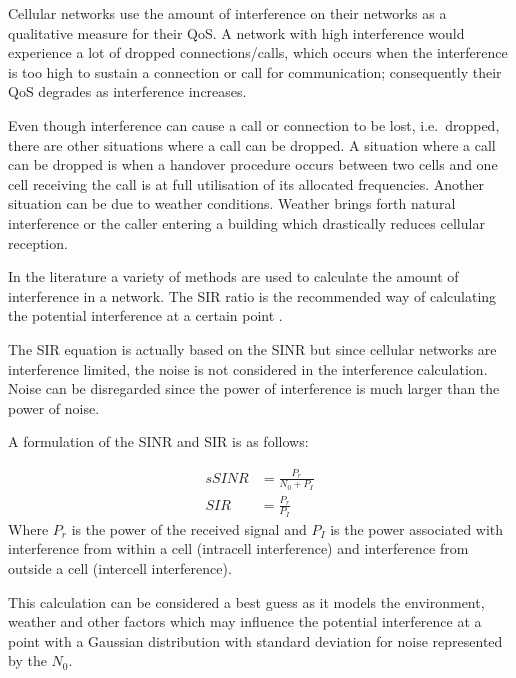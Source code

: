 Cellular networks use the amount of interference on their networks as a qualitative measure for their \gls{QoS}\cite{WirelessCommunications}. A network with high interference would experience a lot of dropped connections/calls, which occurs when the interference is too high to sustain a connection or call for communication; consequently their \gls{QoS} degrades as interference increases\cite{WirelessCommunications,WirelessDigitalCommunications}.

Even though interference can cause a call or connection to be lost, i.e.\ dropped, there are other situations where a call can be dropped\cite{GSMSysEngin}. A situation where a call can be dropped is when a handover procedure occurs between two cells and one cell receiving the call is at full utilisation of its allocated frequencies\cite{GSMSysEngin,WirelessDigitalCommunications}. Another situation can be due to weather conditions. Weather brings forth natural interference or the caller entering a building which drastically reduces cellular reception\cite{WirelessDigitalCommunications}.

In the literature a variety of methods are used to calculate the amount of interference in a network. The \gls{SIR} ratio is the recommended way of calculating the potential interference at a certain point \cite{Karen2004}. 

The \gls{SIR} equation is actually based on the \gls{SINR} but since cellular networks are interference limited, the noise is not considered in the interference calculation\cite{WirelessCommunications}. Noise can be disregarded since the power of interference is much larger than the power of noise\cite{WirelessDigitalCommunications}.

A formulation of the \gls{SINR} and \gls{SIR} is as follows:

\begin{align}s 
	SINR &= \frac{P_r}{N_0 + P_I}\\
	SIR &= \frac{P_r}{P_I}
\end{align}
Where $P_r$ is the power of the received signal and $P_I$ is the power associated with interference from within a cell (intracell interference) and interference from outside a cell (intercell interference)\cite{WirelessCommunications}.

This calculation can be considered a best guess as it models the environment, weather and other factors which may influence the potential interference at a point with a Gaussian distribution with standard deviation for noise represented by the $N_0$\cite{Karen2004}. 

